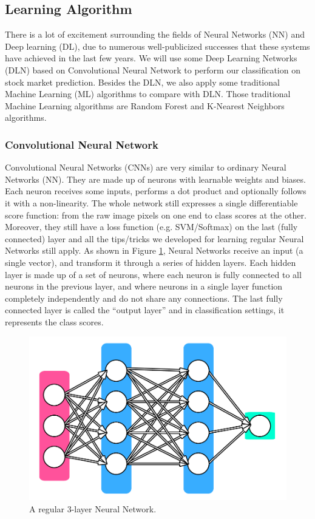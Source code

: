\documentclass[10pt,twocolumn]{article}
\begin{document}
\subsection{Learning Algorithm}
There is a lot of excitement surrounding the fields of Neural Networks (NN) and Deep learning (DL), due to numerous well-publicized successes that these systems have achieved in the last few years. We will use some Deep Learning Networks (DLN) based on Convolutional Neural Network to perform our classification on stock market prediction. Besides the DLN, we also apply some traditional Machine Learning (ML) algorithms to compare with DLN. Those traditional Machine Learning algorithms are Random Forest and K-Nearest Neighbors algorithms.
\subsubsection{Convolutional Neural Network}
Convolutional Neural Networks (CNNs) are very similar to ordinary Neural Networks (NN). They are made up of neurons with learnable weights and biases. Each neuron receives some inputs, performs a dot product and optionally follows it with a non-linearity. The whole network still expresses a single differentiable score function: from the raw image pixels on one end to class scores at the other. Moreover, they still have a loss function (e.g. SVM/Softmax) on the last (fully connected) layer and all the tips/tricks we developed for learning regular Neural Networks still apply.
As shown in Figure \ref{fig:simpleneuralnetwork}, Neural Networks receive an input (a single vector), and transform it through a series of hidden layers. Each hidden layer is made up of a set of neurons, where each neuron is fully connected to all neurons in the previous layer, and where neurons in a single layer function completely independently and do not share any connections. The last fully connected layer is called the “output layer” and in classification settings, it represents the class scores.
\begin{figure}
  \includegraphics[width=\linewidth]{figures/simpleneuralnetwork.png}
  \caption{A regular 3-layer Neural Network.}
  \label{fig:simpleneuralnetwork}
\end{figure}
\end{document}
